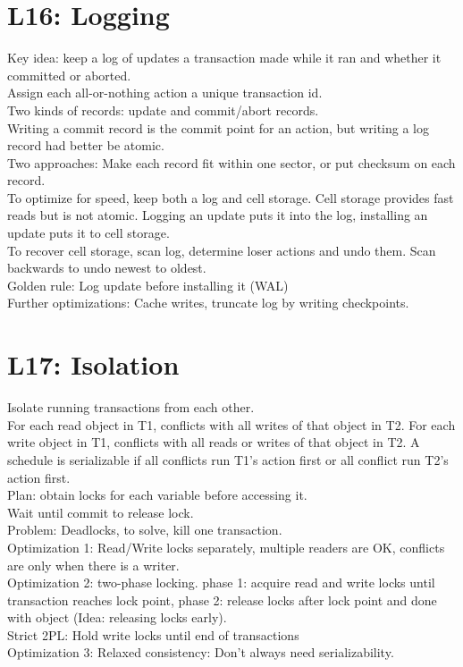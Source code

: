 \section{L16: Logging}
Key idea: keep a log of updates a transaction made while it ran and whether it committed or aborted.\\
Assign each all-or-nothing action a unique transaction id.\\
Two kinds of records: update and commit/abort records.\\
Writing a commit record is the commit point for an action, but writing a log record had better be atomic. \\
Two approaches: Make each record fit within one sector, or put checksum on each record.\\
To optimize for speed, keep both a log and cell storage. Cell storage provides fast reads but is not atomic. Logging an update puts it into the log, installing an update puts it to cell storage.\\
To recover cell storage, scan log, determine loser actions and undo them. Scan backwards to undo newest to oldest.\\
Golden rule: Log update before installing it (WAL)\\
Further optimizations: Cache writes, truncate log by writing checkpoints.
\section{L17: Isolation}
Isolate running transactions from each other.\\
For each read object in T1, conflicts with all writes of that object in T2. For each write object in T1, conflicts with all reads or writes of that object in T2. A schedule is serializable if all conflicts run T1's action first or all conflict run T2's action first.\\
Plan: obtain locks for each variable before accessing it. \\
Wait until commit to release lock.\\
Problem: Deadlocks, to solve, kill one transaction.\\
Optimization 1: Read/Write locks separately, multiple readers are OK, conflicts are only when there is a writer.\\
Optimization 2: two-phase locking. phase 1: acquire read and write locks until transaction reaches lock point, phase 2: release locks after lock point and done with object (Idea: releasing locks early).\\
Strict 2PL: Hold write locks until end of transactions\\
Optimization 3: Relaxed consistency: Don't always need serializability.
